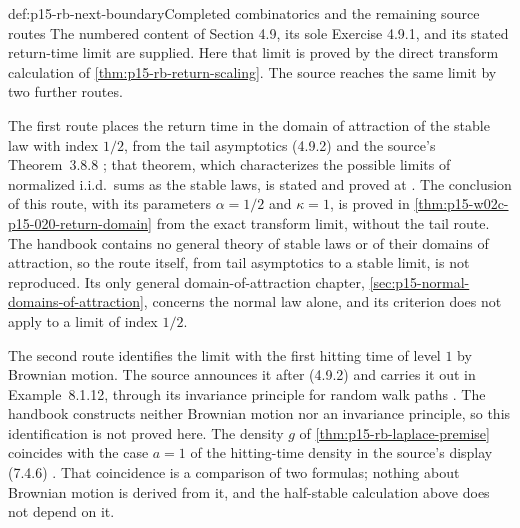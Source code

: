 \begin{proofboundary}{def:p15-rb-next-boundary}{Completed combinatorics and the remaining source routes}
The numbered content of Section 4.9, its sole Exercise 4.9.1,
and its stated return-time limit are supplied.
Here that limit is proved by the direct transform calculation of
\cref{thm:p15-rb-return-scaling}. The source reaches the same
limit by two further routes.

The first route places the return time in the domain of
attraction of the stable law with index \(1/2\), from the tail
asymptotics (4.9.2) and the source's Theorem~3.8.8
\cite[p.~264]{DurrettPTEAuthor2019}; that theorem, which
characterizes the possible limits of normalized i.i.d.\ sums as
the stable laws, is stated and proved at
\cite[Section~3.8, p.~191]{DurrettPTEAuthor2019}.
The conclusion of this route, with its parameters \(\alpha=1/2\)
and \(\kappa=1\), is proved in
\cref{thm:p15-w02c-p15-020-return-domain} from the exact transform
limit, without the tail route. The handbook contains no general
theory of stable laws or of their domains of attraction, so the
route itself, from tail asymptotics to a stable limit, is not
reproduced. Its only general domain-of-attraction chapter,
\cref{sec:p15-normal-domains-of-attraction}, concerns the normal
law alone, and its criterion does not apply to a limit of index
\(1/2\).

The second route identifies the limit with the first hitting
time of level \(1\) by Brownian motion. The source announces it
after (4.9.2) \cite[pp.~264--265]{DurrettPTEAuthor2019} and
carries it out in Example~8.1.12, through its invariance
principle for random walk paths
\cite[Section~8.1, p.~395]{DurrettPTEAuthor2019}. The handbook
constructs neither Brownian motion nor an invariance principle,
so this identification is not proved here.
The density \(g\) of \cref{thm:p15-rb-laplace-premise} coincides
with the case \(a=1\) of the hitting-time density in the source's
display (7.4.6) \cite[Section~7.4, p.~374]{DurrettPTEAuthor2019}.
That coincidence is a comparison of two formulas; nothing about
Brownian motion is derived from it, and the half-stable
calculation above does not depend on it.
\end{proofboundary}
